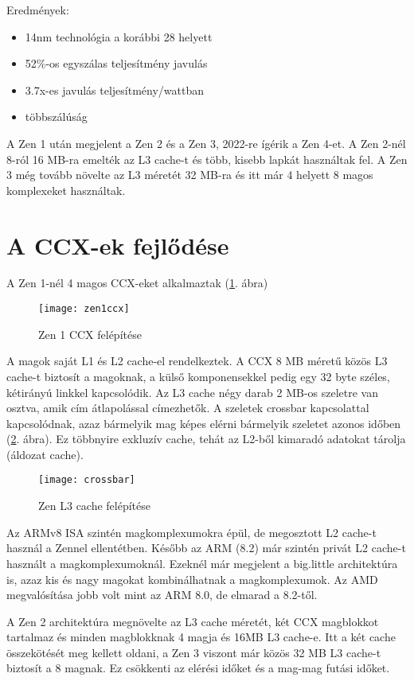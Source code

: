 Eredmények:
\begin{itemize}
    \item 14nm technológia a korábbi 28 helyett
    \item 52\%-os egyszálas teljesítmény javulás
    \item 3.7x-es javulás teljesítmény/wattban
    \item többszálúság
\end{itemize}

A Zen 1 után megjelent a Zen 2 és a Zen 3, 2022-re ígérik a Zen 4-et.
A Zen 2-nél 8-ról 16 MB-ra emelték az L3 cache-t és több, kisebb lapkát használtak fel.
A Zen 3 még tovább növelte az L3 méretét 32 MB-ra és itt már 4 helyett 8 magos komplexeket használtak.

\section{A CCX-ek fejlődése}
A Zen 1-nél 4 magos CCX-eket alkalmaztak (\ref{fig:zen1ccx}. ábra)
\begin{figure}[H]
    \texttt{[image: zen1ccx]}
    \centering
    \caption{Zen 1 CCX felépítése}
    \label{fig:zen1ccx}
\end{figure}
A magok saját L1 és L2 cache-el rendelkeztek.
A CCX 8 MB méretű közös L3 cache-t biztosít a magoknak, a külső komponensekkel pedig egy 32 byte széles, kétirányú linkkel kapcsolódik.
Az L3 cache négy darab 2 MB-os szeletre van osztva, amik cím átlapolással címezhetők.
A szeletek crossbar kapcsolattal kapcsolódnak, azaz bármelyik mag képes elérni bármelyik szeletet azonos időben (\ref{fig:crossbar}. ábra).
Ez többnyire exkluzív cache, tehát az L2-ből kimaradó adatokat tárolja (áldozat cache).
\begin{figure}[H]
    \texttt{[image: crossbar]}
    \centering
    \caption{Zen L3 cache felépítése}
    \label{fig:crossbar}
\end{figure}

Az ARMv8 ISA szintén magkomplexumokra épül, de megosztott L2 cache-t használ a Zennel ellentétben.
Később az ARM (8.2) már szintén privát L2 cache-t használt a magkomplexumoknál.
Ezeknél már megjelent a big.little architektúra is, azaz kis és nagy magokat kombinálhatnak a magkomplexumok.
Az AMD megvalósítása jobb volt mint az ARM 8.0, de elmarad a 8.2-től.

A Zen 2 architektúra megnövelte az L3 cache méretét, két CCX magblokkot tartalmaz és minden magblokknak 4 magja és 16MB L3 cache-e.
Itt a két cache összekötését meg kellett oldani, a Zen 3 viszont már közös 32 MB L3 cache-t biztosít a 8 magnak.
Ez csökkenti az elérési időket és a mag-mag futási időket.

